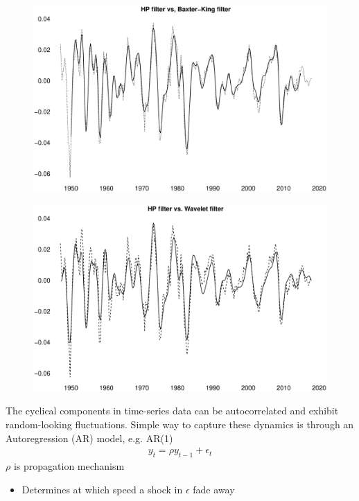 \documentclass{beamer}
\begin{document}
\begin{frame}
  \begin{figure}
    \includegraphics[scale=.3]{baxter_king.eps}
  \end{figure}
\end{frame}


\begin{frame}
  \begin{figure}
    \includegraphics[scale=.3]{wavelet.eps}
  \end{figure}
\end{frame}



\begin{frame}
  The cyclical components in time-series data can be autocorrelated and exhibit random-looking fluctuations.
  Simple way to capture these dynamics is through an Autoregression (AR) model, e.g. AR(1)
  \begin{align}
     y_t = \rho y_{t-1} + \epsilon_t
   \end{align} 
   \medskip
   $\rho$ is propagation mechanism
   \begin{itemize}
      \item Determines at which speed a shock in $\epsilon$ fade away
    \end{itemize} 
\end{frame}
\end{document}

